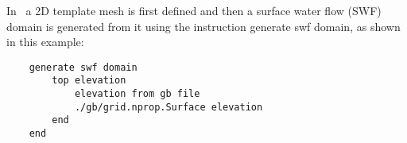 \label{texfile:SWF}
In \mut\, a 2D template mesh is first defined and then a surface water flow (SWF) domain is generated from it using the
instruction \textsf{generate swf domain}, as shown in this example:
\begin{verbatim}
    generate swf domain
        top elevation
            elevation from gb file
            ./gb/grid.nprop.Surface elevation
        end
    end
\end{verbatim}
